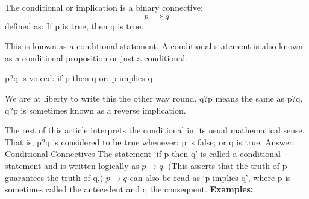 
The conditional or implication is a binary connective:
\[ p \implies q\]
defined as:
If p is true, then q is true.

This is known as a conditional statement.
A conditional statement is also known as a conditional proposition or just a conditional.

p?q is voiced:
if p then q
or:
p implies q

We are at liberty to write this the other way round. q?p means the same as p?q.
q?p is sometimes known as a reverse implication.

The rest of this article interprets the conditional in its usual mathematical sense.
That is, p?q is considered to be true whenever:
p is false; or
q is true.
Answer:
Conditional Connectives
The statement `if p then q' is called a conditional statement and 
is written logically as $p \rightarrow q$.
(This asserts that the truth of p guarantees the truth of q.)
$p \rightarrow q$ can also be read as `p implies q', where p is sometimes 
called the antecedent and q the
consequent.
\textbf{Examples:}

